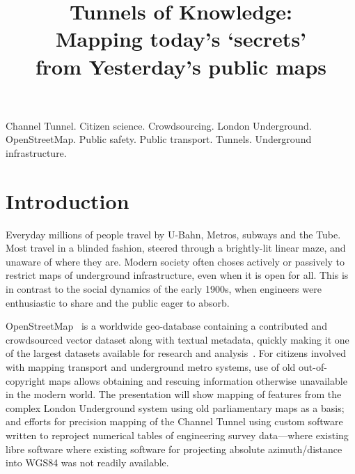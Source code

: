 \documentclass[conference,a4paper]{IEEEtran}
\begin{document}
\vspace{-1em}
\title{\hphantom{:}Tunnels of Knowledge:\\
\vspace{-0.6em}
{\Large \hphantom{'}Mapping today's `secrets'\\\vspace{-0.8em} from Yesterday's public maps}\\
}
\author{%
  \texorpdfstring{%
}{Paul Sladen}}
\maketitle

\begin{IEEEkeywords}
Channel Tunnel.
Citizen science.
Crowdsourcing.
London Underground.
OpenStreetMap.
Public safety.
Public transport.
Tunnels.
Underground infrastructure.
\end{IEEEkeywords}

\IEEEpeerreviewmaketitle

\section{Introduction}
Everyday millions of people travel by U-Bahn, Metros, subways and the
Tube. Most travel in a blinded fashion, steered through a brightly-lit
linear maze, and unaware of where they are. Modern society often
choses actively or passively to restrict maps of underground
infrastructure, even when it is open for all. This is in contrast to
the social dynamics of the early 1900s, when engineers were
enthusiastic to share and the public eager to absorb.

OpenStreetMap~\cite{openstreetmap} is a worldwide geo-database containing a contributed and
crowdsourced vector dataset along with textual metadata, quickly making it one
of the largest datasets available for research and analysis~\cite{street-2006}. For
citizens involved with mapping transport and underground metro
systems, use of old out-of-copyright maps allows obtaining and
rescuing information otherwise unavailable in the modern world. The
presentation will show mapping of features from the complex London
Underground system using old parliamentary maps as a basis; and
efforts for precision mapping of the Channel Tunnel using custom
software written to reproject numerical tables of engineering
survey data---where existing libre software where existing software
for projecting absolute azimuth/distance into WGS84 was not readily available.
\end{document}
